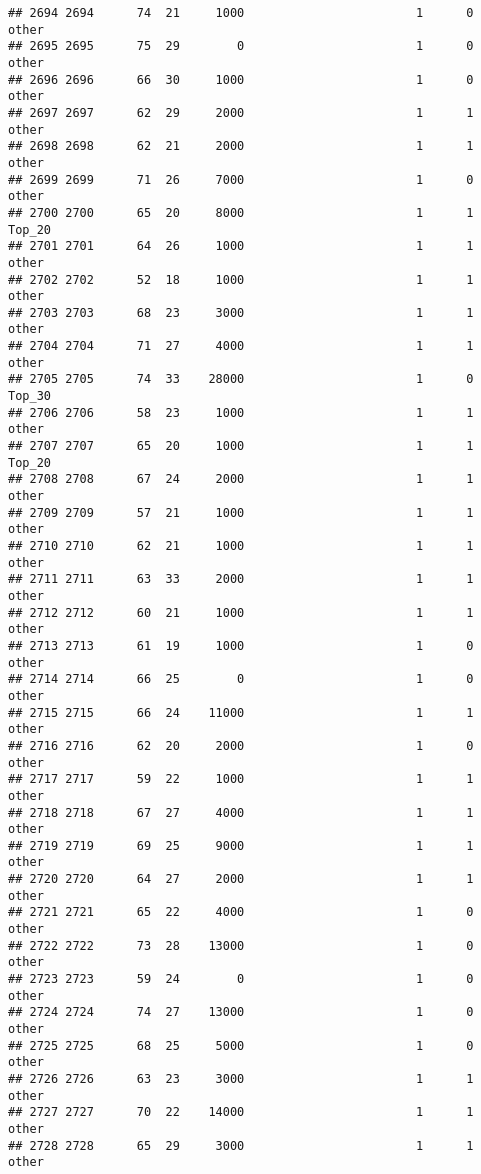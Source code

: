 \documentclass[
]{article}
\begin{document}
\begin{verbatim}
## 2694 2694      74  21     1000                        1      0    other
## 2695 2695      75  29        0                        1      0    other
## 2696 2696      66  30     1000                        1      0    other
## 2697 2697      62  29     2000                        1      1    other
## 2698 2698      62  21     2000                        1      1    other
## 2699 2699      71  26     7000                        1      0    other
## 2700 2700      65  20     8000                        1      1   Top_20
## 2701 2701      64  26     1000                        1      1    other
## 2702 2702      52  18     1000                        1      1    other
## 2703 2703      68  23     3000                        1      1    other
## 2704 2704      71  27     4000                        1      1    other
## 2705 2705      74  33    28000                        1      0   Top_30
## 2706 2706      58  23     1000                        1      1    other
## 2707 2707      65  20     1000                        1      1   Top_20
## 2708 2708      67  24     2000                        1      1    other
## 2709 2709      57  21     1000                        1      1    other
## 2710 2710      62  21     1000                        1      1    other
## 2711 2711      63  33     2000                        1      1    other
## 2712 2712      60  21     1000                        1      1    other
## 2713 2713      61  19     1000                        1      0    other
## 2714 2714      66  25        0                        1      0    other
## 2715 2715      66  24    11000                        1      1    other
## 2716 2716      62  20     2000                        1      0    other
## 2717 2717      59  22     1000                        1      1    other
## 2718 2718      67  27     4000                        1      1    other
## 2719 2719      69  25     9000                        1      1    other
## 2720 2720      64  27     2000                        1      1    other
## 2721 2721      65  22     4000                        1      0    other
## 2722 2722      73  28    13000                        1      0    other
## 2723 2723      59  24        0                        1      0    other
## 2724 2724      74  27    13000                        1      0    other
## 2725 2725      68  25     5000                        1      0    other
## 2726 2726      63  23     3000                        1      1    other
## 2727 2727      70  22    14000                        1      1    other
## 2728 2728      65  29     3000                        1      1    other

\end{verbatim}
\end{document}
